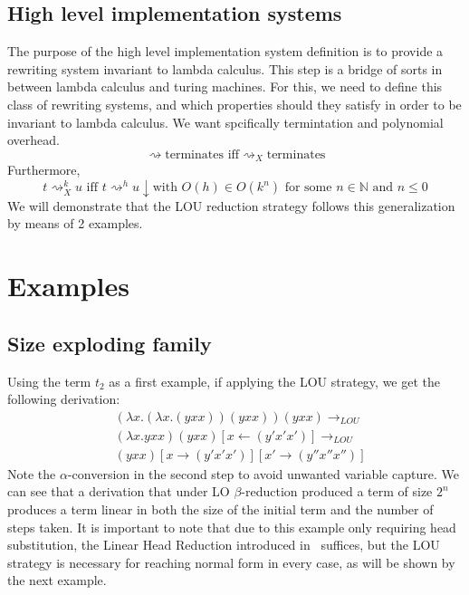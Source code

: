 \documentclass[12pt]{article}
\begin{document}
\subsection{High level implementation systems}
The purpose of the high level implementation system definition is to provide a rewriting system invariant to lambda calculus. This step is a bridge of sorts in between lambda calculus and turing machines. For this, we need to define this class of rewriting systems, and which properties should they satisfy in order to be invariant to lambda calculus. We want spcifically termintation and polynomial overhead.
\[\rightsquigarrow \text{terminates iff} {\rightsquigarrow}_{X} \text{terminates}\]
Furthermore,
\[t {\rightsquigarrow}_{X}^k u \text{ iff } t {\rightsquigarrow}^h u\downarrow \text{with } O(h) \in O(k^n) \text{ for some } n \in \mathbb{N} \text{ and } n \leq 0 \]
We will demonstrate that the LOU reduction strategy follows this generalization by means of 2 examples.
\section{Examples}
\subsection{Size exploding family}
Using the term $t_2$ as a first example, if applying the LOU strategy, we get the following derivation:
\begin{equation}
\begin{split}
  &(\lambda x . ( \lambda x . (yxx) )(yxx))(yxx) \rightarrow_{LOU}  \\
  &(\lambda x . yxx)(yxx)[x \leftarrow (y'x'x')] \rightarrow_{LOU} \\
  &(yxx)[x \rightarrow (y'x'x')][x' \rightarrow (y''x''x'')]
\end{split}
\end{equation}
Note the $\alpha$-conversion in the second step to avoid unwanted variable capture. We can see that a derivation that under LO $\beta$-reduction produced a term of size $2^n$ produces a term linear in both the size of the initial term and the number of steps taken.
It is important to note that due to this example only requiring head substitution, the Linear Head Reduction introduced in~\cite{invariance-of-cost-model} suffices, but the LOU strategy is necessary for reaching normal form in every case, as will be shown by the next example.
\end{document}
